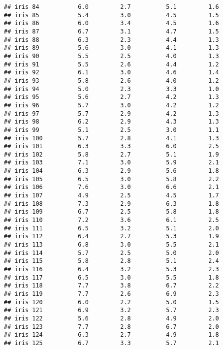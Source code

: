 \documentclass[
]{article}
\begin{document}
\begin{verbatim}
## iris 84           6.0         2.7          5.1         1.6
## iris 85           5.4         3.0          4.5         1.5
## iris 86           6.0         3.4          4.5         1.6
## iris 87           6.7         3.1          4.7         1.5
## iris 88           6.3         2.3          4.4         1.3
## iris 89           5.6         3.0          4.1         1.3
## iris 90           5.5         2.5          4.0         1.3
## iris 91           5.5         2.6          4.4         1.2
## iris 92           6.1         3.0          4.6         1.4
## iris 93           5.8         2.6          4.0         1.2
## iris 94           5.0         2.3          3.3         1.0
## iris 95           5.6         2.7          4.2         1.3
## iris 96           5.7         3.0          4.2         1.2
## iris 97           5.7         2.9          4.2         1.3
## iris 98           6.2         2.9          4.3         1.3
## iris 99           5.1         2.5          3.0         1.1
## iris 100          5.7         2.8          4.1         1.3
## iris 101          6.3         3.3          6.0         2.5
## iris 102          5.8         2.7          5.1         1.9
## iris 103          7.1         3.0          5.9         2.1
## iris 104          6.3         2.9          5.6         1.8
## iris 105          6.5         3.0          5.8         2.2
## iris 106          7.6         3.0          6.6         2.1
## iris 107          4.9         2.5          4.5         1.7
## iris 108          7.3         2.9          6.3         1.8
## iris 109          6.7         2.5          5.8         1.8
## iris 110          7.2         3.6          6.1         2.5
## iris 111          6.5         3.2          5.1         2.0
## iris 112          6.4         2.7          5.3         1.9
## iris 113          6.8         3.0          5.5         2.1
## iris 114          5.7         2.5          5.0         2.0
## iris 115          5.8         2.8          5.1         2.4
## iris 116          6.4         3.2          5.3         2.3
## iris 117          6.5         3.0          5.5         1.8
## iris 118          7.7         3.8          6.7         2.2
## iris 119          7.7         2.6          6.9         2.3
## iris 120          6.0         2.2          5.0         1.5
## iris 121          6.9         3.2          5.7         2.3
## iris 122          5.6         2.8          4.9         2.0
## iris 123          7.7         2.8          6.7         2.0
## iris 124          6.3         2.7          4.9         1.8
## iris 125          6.7         3.3          5.7         2.1

\end{verbatim}
\end{document}
